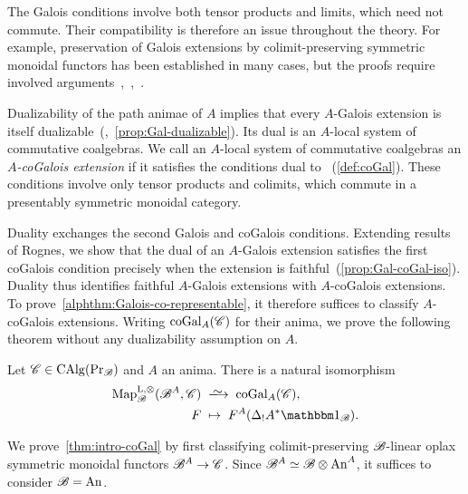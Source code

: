 \documentclass[english,svgnames,table]{article}
\begin{document}
    The Galois conditions involve both tensor products and limits, which need not commute. Their compatibility is therefore an issue throughout the theory.
    For example, preservation of Galois extensions by colimit-preserving symmetric monoidal functors has been established in many cases, but the proofs require involved arguments~\cite[Lemma~7.1.1]{Rognes-2008-Galois},~\cite[Propositions~6.6 and~6.13]{Mathew-2016-Galois},~\cite[Proposition~3.12]{BMCSY-cycloshift}.

    Dualizability of the path animae of $A$ implies that every $A$-Galois extension is itself dualizable~(\cite[Proposition~6.2.1]{Rognes-2008-Galois},~\cref{prop:Gal-dualizable}).
    Its dual is an $A$-local system of commutative coalgebras.
    We call an $A$-local system of commutative coalgebras an \emph{$A$-coGalois extension} if it satisfies the conditions dual to ~(\cref{def:coGal}).
    These conditions involve only tensor products and    colimits, which commute in a presentably symmetric monoidal category.

    Duality exchanges the second Galois and coGalois conditions.
    Extending results of Rognes, we show that the dual of an $A$-Galois extension satisfies the first coGalois condition precisely when the extension is faithful~(\cref{prop:Gal-coGal-iso}).
    Duality thus identifies faithful $A$-Galois extensions with $A$-coGalois extensions.
    To prove~\cref{alphthm:Galois-co-representable}, it therefore suffices to classify $A$-coGalois extensions. Writing $\mathrm{coGal}_A(\mathscr{C})$ for their anima, we prove the following theorem without any dualizability assumption on $A$.

    \begin{alphThmPrime}
    \label{thm:intro-coGal}
        Let $\mathscr{C} \in \operatorname{CAlg}(\operatorname{Pr}_{\mathscr{B}})$ and $A$ an anima.
        There is a natural isomorphism
        \begin{equation*}
            \begin{split}
                \MapBo(\basecat^A, \cC) & \;\isotoo\; \coGal_A(\cC), \\
                F & \;\mapsto\; F^A(\Delta_!A^*\ounit_{\basecat}).
            \end{split}
        \end{equation*}
    \end{alphThmPrime} 
    
    We prove~\cref{thm:intro-coGal} by first classifying colimit-preserving $\mathscr{B}$-linear oplax symmetric monoidal functors $\mathscr{B}^A \to \mathscr{C}$.
    Since $\mathscr{B}^A \simeq \mathscr{B} \otimes \mathrm{An}^A$, it suffices to consider $\mathscr{B} = \mathrm{An}$.
\end{document}
